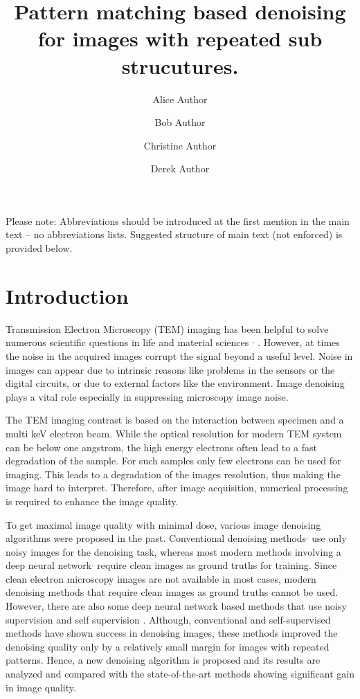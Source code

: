 \documentclass[fleqn,10pt]{wlscirep}
\title{Pattern matching based denoising for images with repeated sub strucutures.}
\author[1,*]{Alice Author}
\author[2]{Bob Author}
\author[1,2,+]{Christine Author}
\author[2,+]{Derek Author}
\affil[1]{Affiliation, department, city, postcode, country}
\affil[2]{Affiliation, department, city, postcode, country}
\affil[*]{corresponding.author@email.example}
\affil[+]{these authors contributed equally to this work}
\begin{document}
\flushbottom
\maketitle
%
%
\thispagestyle{empty}

\noindent Please note: Abbreviations should be introduced at the first mention in the main text – no abbreviations lists. Suggested structure of main text (not enforced) is provided below.

\section*{Introduction}

Transmission Electron Microscopy (TEM) imaging has been helpful to solve numerous scientific questions in life and material sciences \cite{CURRY200691}$^{,}$\cite{WANG2008395} . However, at times the noise in the acquired images corrupt the signal beyond a useful level. Noise in images can appear due to intrinsic reasons like problems in the sensors or the digital circuits, or due to external factors like the environment. Image denoising plays a vital role especially in suppressing microscopy image noise.

The TEM imaging contrast is based on the interaction between specimen and a multi keV electron beam. While the optical resolution for modern TEM system can be below one angstrom, the high energy electrons often lead to a fast degradation of the sample. For such samples only few electrons can be used for imaging. This leads to a degradation of the images resolution, thus making the image hard to interpret. Therefore, after image acquisition, numerical processing is required to enhance the image quality.

To get maximal image quality with minimal dose, various image denoising algorithms were proposed in the past. Conventional denoising methods\cite{bcm_nlm}$^{,}$ \cite{DBLP:journals/tip/BM3D} use only noisy images for the denoising task, whereas most modern methods involving a deep neural network\cite{zhang2018ffdnet}$^{,}$ \cite{zhang2017beyond} require clean images as ground truths for training. Since clean electron microscopy images are not available in most cases, modern denoising methods that require clean images as ground truths cannot be used. However, there are also some deep neural network based methods that use noisy supervision\cite{DBLP:journals/corr/abs-1803-04189} and self supervision\cite{krull2019noise2void} . Although, conventional and self-supervised methods have shown success in denoising images, these methods improved the denoising quality only by a relatively small margin for images with repeated patterns. Hence, a new denoising algorithm is proposed and its results are analyzed and compared with the state-of-the-art methods showing significant gain in image quality. 
\end{document}
